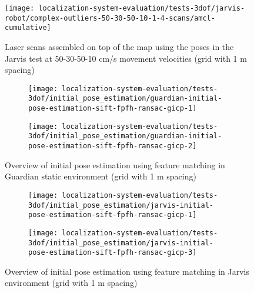 \begin{figure}[H]
	\centering
	\texttt{[image: localization-system-evaluation/tests-3dof/jarvis-robot/complex-outliers-50-30-50-10-1-4-scans/amcl-cumulative]}
	\caption{Laser scans assembled on top of the map using the  poses in the Jarvis test at 50-30-50-10 cm/s movement velocities (grid with 1 m spacing)}
	\label{fig:localization-system-evaluation_complex-path-with-outliers-50-30-50-10cm-per-sec-velocity-1-4-scans-amcl-cumulative}
\end{figure}


\begin{figure}[H]
	\centering
	\begin{subfigure}[ht]{0.49\textwidth}
		\centering
		\texttt{[image: localization-system-evaluation/tests-3dof/initial\_pose\_estimation/guardian-initial-pose-estimation-sift-fpfh-ransac-gicp-1]}
	\end{subfigure}
	\par\smallskip
	\begin{subfigure}[ht]{0.49\textwidth}
		\centering
		\texttt{[image: localization-system-evaluation/tests-3dof/initial\_pose\_estimation/guardian-initial-pose-estimation-sift-fpfh-ransac-gicp-2]}
	\end{subfigure}
	\caption{Overview of initial pose estimation using feature matching in Guardian static environment (grid with 1 m spacing)}
	\label{fig:localization-system-evaluation_ship-interior-initial-pose-estimation-sift-fpfh-ransac-gicp-1}
\end{figure}


\begin{figure}[H]
	\centering
	\begin{subfigure}[ht]{0.49\textwidth}
		\centering
		\texttt{[image: localization-system-evaluation/tests-3dof/initial\_pose\_estimation/jarvis-initial-pose-estimation-sift-fpfh-ransac-gicp-1]}
	\end{subfigure}
	\par\smallskip
	\begin{subfigure}[ht]{0.49\textwidth}
		\centering
		\texttt{[image: localization-system-evaluation/tests-3dof/initial\_pose\_estimation/jarvis-initial-pose-estimation-sift-fpfh-ransac-gicp-3]}
	\end{subfigure}
	\caption{Overview of initial pose estimation using feature matching in Jarvis environment (grid with 1 m spacing)}
	\label{fig:localization-system-evaluation_jarvis-initial-pose-estimation-sift-fpfh-ransac-gicp-1}
\end{figure}


